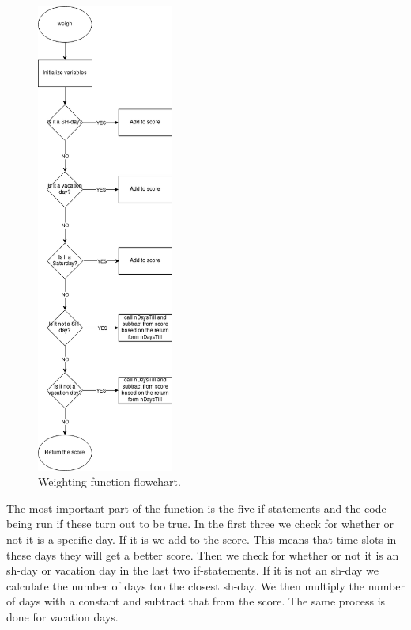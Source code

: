 \clearpage
\begin{figure}[ht!]
    \centering
    \includegraphics[width=0.4\textwidth]{media/Flowcharts/weight_flow.png}
    \caption{Weighting function flowchart.}
    \label{fig:weighting_flow}
\end{figure}

The most important part of the function is the five if-statements and the code being run if these turn out to be true. In the first three we check for whether or not it is a specific day. If it is we add to the score. This means that time slots in these days they will get a better score. Then we check for whether or not it is an sh-day or vacation day in the last two if-statements. If it is not an sh-day we calculate the number of days too the closest sh-day. We then multiply the number of days with a constant and subtract that from the score. The same process is done for vacation days. 

